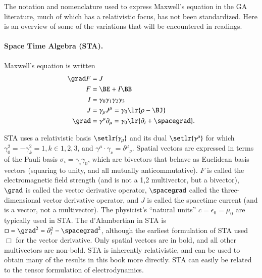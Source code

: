 %
%
The notation and nomenclature used to express Maxwell's equation in the GA literature, much of which has a relativistic focus, has not been standardized.
Here is an overview of some of the variations that will be encountered in readings.

\paragraph{Space Time Algebra (STA).  \citep{doran2003gap}}

Maxwell's equation is written
\begin{dmath}\label{eqn:galiterature:80}
\begin{aligned}
\grad F &= J \\
F &= \BE + I \BB \\
I &= \gamma_0 \gamma_1 \gamma_2 \gamma_3 \\
J &= \gamma_\mu J^\mu = \gamma_0 \lr{ \rho - \BJ } \\
\grad &= \gamma^\mu \partial_\mu = \gamma_0 \lr{ \partial_t + \spacegrad }.
\end{aligned}
\end{dmath}

STA uses a relativistic basis \( \setlr{ \gamma_\mu } \) and its dual \( \setlr{ \gamma^\mu} \) for which \( \gamma_0^2 = -\gamma_k^2 = 1, k \in 1,2,3 \), and \( \gamma^\mu \cdot \gamma_\nu = {\delta^\mu}_\nu \).
Spatial vectors are expressed in terms of the Pauli basis \( \sigma_i = \gamma_i \gamma_0 \), which are bivectors that behave as Euclidean basis vectors (squaring to unity, and all mutually anticommutative).
\( F \) is called the electromagnetic field strength (and is not a 1,2 multivector, but a bivector), \( \grad \) is called the vector derivative operator, \( \spacegrad \) called the three-dimensional vector derivative operator, and \( J \) is called the spacetime current (and is a vector, not a multivector).
The physicist's ``natural units'' \( c = \epsilon_0 = \mu_0 \) are typically used in STA.
The d'Alambertian in STA is \( \Box = \grad^2 = \partial_t^2 - \spacegrad^2 \), although the earliest
formulation of STA \citep{hestenes1966space} used \( \Box \) for the vector derivative.
Only spatial vectors are in bold, and all other multivectors are non-bold.
STA is inherently relativistic, and can be used to obtain many of the results in this book more directly.
STA can easily be related to the tensor formulation of electrodynamics.

